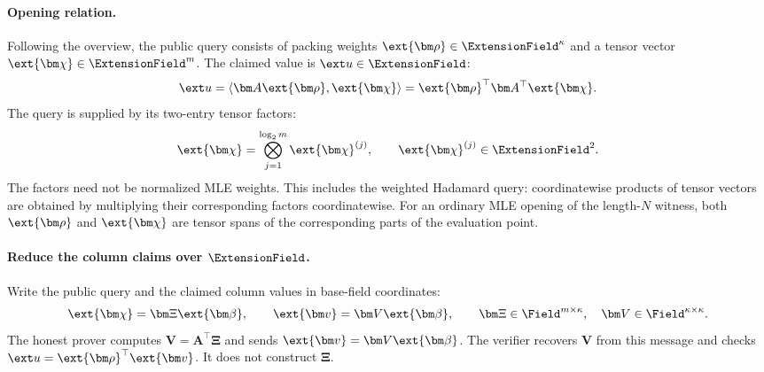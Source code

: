 \paragraph{Opening relation.}
Following the overview, the public query consists of packing weights
\(\ext{\bm\rho}\in\ExtensionField^\kappa\) and a tensor vector
\(\ext{\bm\chi}\in\ExtensionField^m\). The claimed value is
\(\ext u\in\ExtensionField\):
\begin{equation}
    \ext u
    =\langle\bm A\ext{\bm\rho},\ext{\bm\chi}\rangle
    =\ext{\bm\rho}^{\top}\bm A^\top\ext{\bm\chi}.
\label{eq:pcs-opening-relation}
\end{equation}
The query is supplied by its two-entry tensor factors:
\[
    \ext{\bm\chi}
    =\bigotimes_{j=1}^{\log_2m}\ext{\bm\chi}^{(j)},
    \qquad
    \ext{\bm\chi}^{(j)}\in\ExtensionField^2.
\]
The factors need not be normalized MLE weights. This includes the
weighted Hadamard query: coordinatewise products of tensor vectors
are obtained by multiplying their corresponding factors coordinatewise.
For an ordinary MLE opening of the length-\(N\) witness, both
\(\ext{\bm\rho}\) and \(\ext{\bm\chi}\) are tensor spans of the
corresponding parts of the evaluation point.

\medskip{}

\paragraph{Reduce the column claims over \(\ExtensionField\).}
Write the public query and the claimed column values in base-field
coordinates:
\[
    \ext{\bm\chi}=\bm\Xi\ext{\bm\beta},
    \qquad
    \ext{\bm v}=\bm V\ext{\bm\beta},
    \qquad
    \bm\Xi\in\Field^{m\times\kappa},
    \quad
    \bm V\in\Field^{\kappa\times\kappa}.
\]
The honest prover computes \(\bm V=\bm A^\top\bm\Xi\) and sends
\(\ext{\bm v}=\bm V\ext{\bm\beta}\).
The verifier recovers \(\bm V\) from this message and checks
\(\ext u=\ext{\bm\rho}^{\top}\ext{\bm v}\).
It does not construct \(\bm\Xi\).

